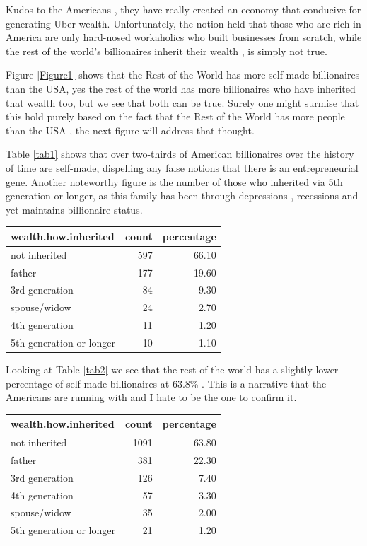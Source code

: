 \documentclass[11pt,preprint]{elsarticle}
\let\origtable\table
\let\endorigtable\endtable
\renewenvironment{table}[1][2] {
    \expandafter\origtable\expandafter[H]
} {
    \endorigtable
}
\numberwithin{equation}{section}
\numberwithin{figure}{section}
\numberwithin{table}{section}
\begin{document}
Kudos to the Americans , they have really created an economy that
conducive for generating Uber wealth. Unfortunately, the notion held
that those who are rich in America are only hard-nosed workaholics who
built businesses from scratch, while the rest of the world's
billionaires inherit their wealth , is simply not true.

Figure \ref{Figure1} shows that the Rest of the World has more self-made
billionaires than the USA, yes the rest of the world has more
billionaires who have inherited that wealth too, but we see that both
can be true. Surely one might surmise that this hold purely based on the
fact that the Rest of the World has more people than the USA , the next
figure will address that thought.

Table \ref{tab1} shows that over two-thirds of American billionaires
over the history of time are self-made, dispelling any false notions
that there is an entrepreneurial gene. Another noteworthy figure is the
number of those who inherited via 5th generation or longer, as this
family has been through depressions , recessions and yet maintains
billionaire status.

\begin{table}[ht]
\centering
\begin{tabular}{lrr}
  \hline
wealth.how.inherited & count & percentage \\ 
  \hline
not inherited & 597 & 66.10 \\ 
  father & 177 & 19.60 \\ 
  3rd generation &  84 & 9.30 \\ 
  spouse/widow &  24 & 2.70 \\ 
  4th generation &  11 & 1.20 \\ 
  5th generation or longer &  10 & 1.10 \\ 
   \hline
\end{tabular}
\caption{USA Billionaires by Inheritance Status \label{tab1}} 
\end{table}

Looking at Table \ref{tab2} we see that the rest of the world has a
slightly lower percentage of self-made billionaires at 63.8\% . This is
a narrative that the Americans are running with and I hate to be the one
to confirm it.

\begin{table}[ht]
\centering
\begin{tabular}{lrr}
  \hline
wealth.how.inherited & count & percentage \\ 
  \hline
not inherited & 1091 & 63.80 \\ 
  father & 381 & 22.30 \\ 
  3rd generation & 126 & 7.40 \\ 
  4th generation &  57 & 3.30 \\ 
  spouse/widow &  35 & 2.00 \\ 
  5th generation or longer &  21 & 1.20 \\ 
   \hline
\end{tabular}
\caption{Rest of the World by Inheritance Status\label{tab2}} 
\end{table}
\end{document}
